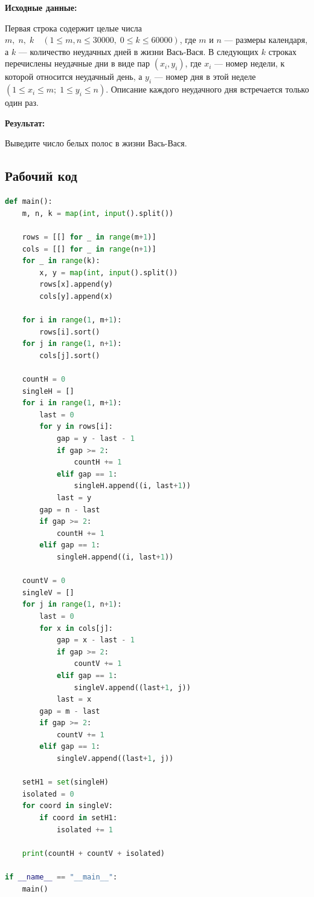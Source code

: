 \documentclass[a4paper,12pt]{article}
\begin{document}
\textbf{Исходные данные:}
\begin{quotebox}
    Первая строка содержит целые числа $m,\;n,\;k \quad(1 \le m,n \le 30000,\;0 \le k \le 60000)$, где \(m\) и \(n\) — размеры календаря, а \(k\) — количество неудачных дней в жизни Вась‑Вася. В следующих \(k\) строках перечислены неудачные дни в виде пар $(x_i, y_i)$, где \(x_i\) — номер недели, к которой относится неудачный день, а \(y_i\) — номер дня в этой неделе $(1 \le x_i \le m;\;1 \le y_i \le n)$. Описание каждого неудачного дня встречается только один раз.
\end{quotebox}
\textbf{Результат:}
\begin{quotebox}
    Выведите число белых полос в жизни Вась-Вася.
\end{quotebox}
\subsection*{Рабочий код}
\begin{lstlisting}[language=python]
def main():
    m, n, k = map(int, input().split())

    rows = [[] for _ in range(m+1)]
    cols = [[] for _ in range(n+1)]
    for _ in range(k):
        x, y = map(int, input().split())
        rows[x].append(y)
        cols[y].append(x)

    for i in range(1, m+1):
        rows[i].sort()
    for j in range(1, n+1):
        cols[j].sort()

    countH = 0
    singleH = []
    for i in range(1, m+1):
        last = 0
        for y in rows[i]:
            gap = y - last - 1
            if gap >= 2:
                countH += 1
            elif gap == 1:
                singleH.append((i, last+1))
            last = y
        gap = n - last
        if gap >= 2:
            countH += 1
        elif gap == 1:
            singleH.append((i, last+1))

    countV = 0
    singleV = []
    for j in range(1, n+1):
        last = 0
        for x in cols[j]:
            gap = x - last - 1
            if gap >= 2:
                countV += 1
            elif gap == 1:
                singleV.append((last+1, j))
            last = x
        gap = m - last
        if gap >= 2:
            countV += 1
        elif gap == 1:
            singleV.append((last+1, j))

    setH1 = set(singleH)
    isolated = 0
    for coord in singleV:
        if coord in setH1:
            isolated += 1

    print(countH + countV + isolated)

if __name__ == "__main__":
    main()
\end{lstlisting}
\end{document}
